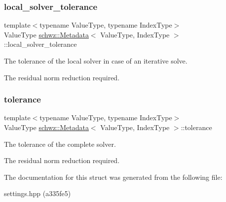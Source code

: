 \subsubsection{\texorpdfstring{local\+\_\+solver\+\_\+tolerance}{local\_solver\_tolerance}}
{\footnotesize\ttfamily template$<$typename Value\+Type, typename Index\+Type$>$ \\
Value\+Type \hyperlink{structschwz_1_1Metadata}{schwz\+::\+Metadata}$<$ Value\+Type, Index\+Type $>$\+::local\+\_\+solver\+\_\+tolerance}



The tolerance of the local solver in case of an iterative solve. 

The residual norm reduction required. \mbox{\label{structschwz_1_1Metadata_a366db94e2a75dbdd82616e0d0b33bb86}} 
\subsubsection{\texorpdfstring{tolerance}{tolerance}}
{\footnotesize\ttfamily template$<$typename Value\+Type, typename Index\+Type$>$ \\
Value\+Type \hyperlink{structschwz_1_1Metadata}{schwz\+::\+Metadata}$<$ Value\+Type, Index\+Type $>$\+::tolerance}



The tolerance of the complete solver. 

The residual norm reduction required. 

The documentation for this struct was generated from the following file\+:\begin{DoxyCompactItemize}
\item 
settings.\+hpp (a335fe5)\end{DoxyCompactItemize}
